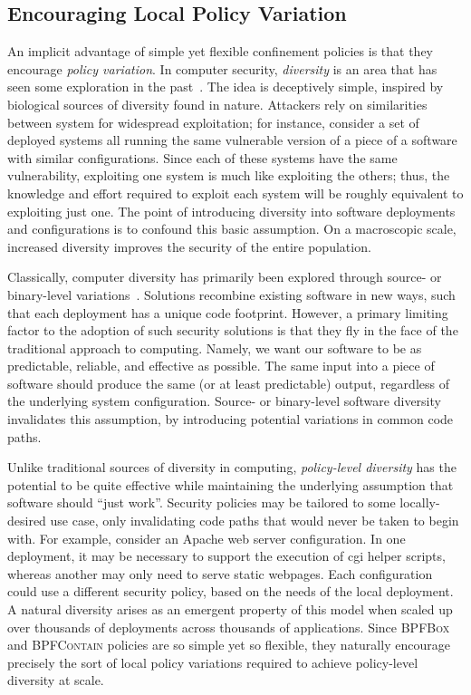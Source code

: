 \documentclass[
  fontsize=12pt,
  titlepage=firstiscover,
  paper=letter,
oneside,
  cleardoublepage=plain,
  parskip=half-,
  DIV=10,
  parindent,
  appendixprefix,
  chapterprefix,
  listof=totoc,
]{scrbook}
\newcommand{\bpfbox}{\textsc{BPFBox}}
\newcommand{\bpfcontain}{\textsc{BPFContain}}
\begin{document}
\subsection{Encouraging Local Policy Variation}

An implicit advantage of simple yet flexible confinement policies is that they encourage
\textit{policy variation}. In computer security, \textit{diversity} is an area that has
seen some exploration in the past~\cite{somayaji2007_immunology, persaud2016_frankenssl,
matrawy2005_mitigating, neti2012_software}. The idea is deceptively simple, inspired by
biological sources of diversity found in nature. Attackers rely on similarities between
system for widespread exploitation; for instance, consider a set of deployed systems all
running the same vulnerable version of a piece of a software with similar configurations.
Since each of these systems have the same vulnerability, exploiting one system is much
like exploiting the others; thus, the knowledge and effort required to exploit each system
will be roughly equivalent to exploiting just one. The point of introducing diversity into
software deployments and configurations is to confound this basic assumption. On
a macroscopic scale, increased diversity improves the security of the entire population.

Classically, computer diversity has primarily been explored through source- or
binary-level variations~\cite{somayaji2007_immunology, persaud2016_frankenssl,
neti2012_software}. Solutions recombine existing software in new ways, such that each
deployment has a unique code footprint. However, a primary limiting factor to the adoption
of such security solutions is that they fly in the face of the traditional approach to
computing. Namely, we want our software to be as predictable, reliable, and effective as
possible. The same input into a piece of software should produce the same (or at least
predictable) output, regardless of the underlying system configuration. Source- or
binary-level software diversity invalidates this assumption, by introducing potential
variations in common code paths.

Unlike traditional sources of diversity in computing, \textit{policy-level diversity} has
the potential to be quite effective while maintaining the underlying assumption that
software should \enquote{just work}. Security policies may be tailored to some
locally-desired use case, only invalidating code paths that would never be taken to begin
with. For example, consider an Apache web server configuration. In one deployment, it may
be necessary to support the execution of \gls{cgi} helper scripts, whereas another may
only need to serve static webpages. Each configuration could use a different security
policy, based on the needs of the local deployment. A natural diversity arises as an
emergent property of this model when scaled up over thousands of deployments across
thousands of applications.  Since \bpfbox{} and \bpfcontain{} policies are so simple yet
so flexible, they naturally encourage precisely the sort of local policy variations
required to achieve policy-level diversity at scale.
\end{document}
